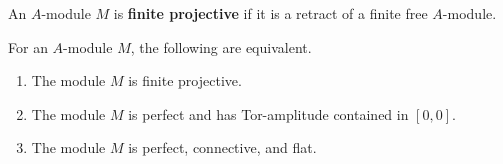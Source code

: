 \begin{definition}
\label{def:finite-projective-module-spectrum}
An $A$-module $M$ is \textbf{finite projective} if it is a retract of a
finite free $A$-module.
\end{definition}

\begin{proposition}
\label{prop:finite-projective-characterization}
For an $A$-module $M$, the following are equivalent.
\begin{enumerate}[label=(\roman*)]
    \item The module $M$ is finite projective.

    \item The module $M$ is perfect and has Tor-amplitude contained in
    $[0,0]$.

    \item The module $M$ is perfect, connective, and flat.
\end{enumerate}
\end{proposition}
